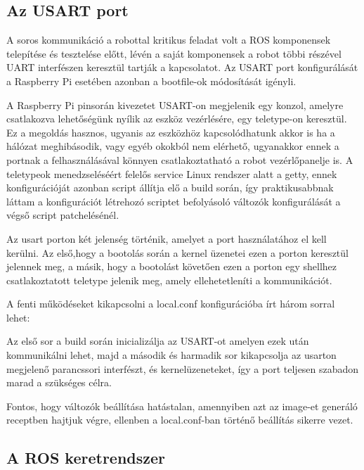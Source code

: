 \subsection{Az USART port}

A soros kommunikáció a robottal kritikus feladat volt a ROS komponensek
telepítése és tesztelése előtt, lévén a saját komponensek a robot többi részével
UART interfészen keresztül tartják a kapcsolatot. Az USART port konfigurálását a
Raspberry Pi esetében azonban a bootfile-ok módosítását igényli.

A Raspberry Pi pinsorán kivezetet USART-on megjelenik egy konzol, amelyre
csatlakozva lehetőségünk nyílik az eszköz vezérlésére, egy teletype-on
keresztül. Ez a megoldás hasznos, ugyanis az eszközhöz kapcsolódhatunk akkor is
ha a hálózat meghibásodik, vagy egyéb okokból nem elérhető, ugyanakkor ennek a
portnak a felhasználásával könnyen csatlakoztatható a robot vezérlőpanelje is.
A teletypeok menedzseléséért felelős service Linux rendszer alatt a getty, ennek
konfigurációját azonban script állítja elő a build során, így praktikusabbnak
láttam a konfigurációt létrehozó scriptet befolyásoló változók konfigurálását a
végső script patchelésénél.

Az usart porton két jelenség történik, amelyet a port használatához el kell
kerülni. Az első,hogy a bootolás során a kernel üzenetei ezen a porton keresztül
jelennek meg, a másik, hogy a bootolást követően ezen a porton egy shellhez
csatlakoztatott teletype jelenik meg, amely ellehetetleníti a kommunikációt.

A fenti működéseket kikapcsolni a local.conf konfigurációba írt három sorral
lehet:


Az első sor a build során inicializálja az USART-ot amelyen ezek után
kommunikálni lehet, majd a második és harmadik sor kikapcsolja az usarton
megjelenő parancssori interfészt, és kernelüzeneteket, így a port teljesen
szabadon marad a szükséges célra.

Fontos, hogy változók beállítása hatástalan, amennyiben azt az image-et generáló
receptben hajtjuk végre, ellenben a local.conf-ban történő beállítás sikerre
vezet. 

\subsection{A ROS keretrendszer}

